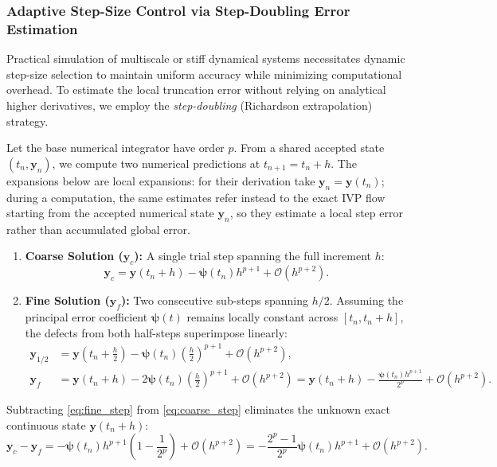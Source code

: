 \subsubsection{Adaptive Step-Size Control via Step-Doubling Error Estimation}
Practical simulation of multiscale or stiff dynamical systems necessitates dynamic step-size selection to maintain uniform accuracy while minimizing computational overhead. To estimate the local truncation error without relying on analytical higher derivatives, we employ the \emph{step-doubling} (Richardson extrapolation) strategy.

Let the base numerical integrator have order $p$. From a shared accepted state $(t_n, \mathbf{y}_n)$, we compute two numerical predictions at $t_{n+1} = t_n + h$. The expansions below are local expansions: for their derivation take $\mathbf y_n=\mathbf y(t_n)$; during a computation, the same estimates refer instead to the exact IVP flow starting from the accepted numerical state $\mathbf y_n$, so they estimate a local step error rather than accumulated global error.
\begin{enumerate}
    \item \textbf{Coarse Solution ($\mathbf{y}_c$):} A single trial step spanning the full increment $h$:
    \begin{equation}
    \label{eq:coarse_step}
    \mathbf{y}_c = \mathbf{y}(t_n + h) - \boldsymbol{\psi}(t_n) h^{p+1} + \mathcal{O}(h^{p+2}).
    \end{equation}
    \item \textbf{Fine Solution ($\mathbf{y}_f$):} Two consecutive sub-steps spanning $h/2$. Assuming the principal error coefficient $\boldsymbol{\psi}(t)$ remains locally constant across $[t_n, t_n + h]$, the defects from both half-steps superimpose linearly:
    \begin{align}
    \mathbf{y}_{1/2} &= \mathbf{y}\left(t_n + \frac{h}{2}\right) - \boldsymbol{\psi}(t_n) \left(\frac{h}{2}\right)^{p+1} + \mathcal{O}(h^{p+2}), \label{eq:fine_half_step} \\
    \mathbf{y}_f &= \mathbf{y}(t_n + h) - 2 \boldsymbol{\psi}(t_n) \left(\frac{h}{2}\right)^{p+1} + \mathcal{O}(h^{p+2}) = \mathbf{y}(t_n + h) - \frac{\boldsymbol{\psi}(t_n) h^{p+1}}{2^p} + \mathcal{O}(h^{p+2}). \label{eq:fine_step}
    \end{align}
\end{enumerate}
Subtracting \eqref{eq:fine_step} from \eqref{eq:coarse_step} eliminates the unknown exact continuous state $\mathbf{y}(t_n + h)$:
\begin{equation}
\label{eq:richardson_subtraction}
\mathbf{y}_c - \mathbf{y}_f = -\boldsymbol{\psi}(t_n) h^{p+1} \left(1 - \frac{1}{2^p}\right) + \mathcal{O}(h^{p+2}) = -\frac{2^p - 1}{2^p} \boldsymbol{\psi}(t_n) h^{p+1} + \mathcal{O}(h^{p+2}).
\end{equation}
